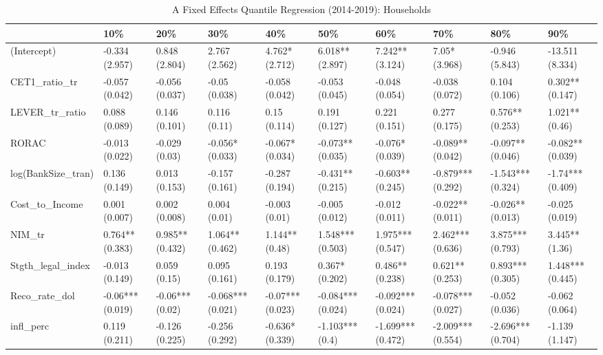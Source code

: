 \begin{table}[ht]
\centering
\caption{A Fixed Effects Quantile Regression (2014-2019): Households} 
\begingroup\small
\begin{tabular}{llllllllll}
  \toprule
 & 10\% & 20\% & 30\% & 40\% & 50\% & 60\% & 70\% & 80\% & 90\% \\ 
  \midrule
(Intercept) & -0.334 (2.957) & 0.848 (2.804) & 2.767 (2.562) & 4.762* (2.712) & 6.018** (2.897) & 7.242** (3.124) & 7.05* (3.968) & -0.946 (5.843) & -13.511 (8.334) \\ 
  CET1\_ratio\_tr & -0.057 (0.042) & -0.056 (0.037) & -0.05 (0.038) & -0.058 (0.042) & -0.053 (0.045) & -0.048 (0.054) & -0.038 (0.072) & 0.104 (0.106) & 0.302** (0.147) \\ 
  LEVER\_tr\_ratio & 0.088 (0.089) & 0.146 (0.101) & 0.116 (0.11) & 0.15 (0.114) & 0.191 (0.127) & 0.221 (0.151) & 0.277 (0.175) & 0.576** (0.253) & 1.021** (0.46) \\ 
  RORAC & -0.013 (0.022) & -0.029 (0.03) & -0.056* (0.033) & -0.067* (0.034) & -0.073** (0.035) & -0.076* (0.039) & -0.089** (0.042) & -0.097** (0.046) & -0.082** (0.039) \\ 
  log(BankSize\_tran) & 0.136 (0.149) & 0.013 (0.153) & -0.157 (0.161) & -0.287 (0.194) & -0.431** (0.215) & -0.603** (0.245) & -0.879*** (0.292) & -1.543*** (0.324) & -1.74*** (0.409) \\ 
  Cost\_to\_Income & 0.001 (0.007) & 0.002 (0.008) & 0.004 (0.01) & -0.003 (0.01) & -0.005 (0.012) & -0.012 (0.011) & -0.022** (0.011) & -0.026** (0.013) & -0.025 (0.019) \\ 
  NIM\_tr & 0.764** (0.383) & 0.985** (0.432) & 1.064** (0.462) & 1.144** (0.48) & 1.548*** (0.503) & 1.975*** (0.547) & 2.462*** (0.636) & 3.875*** (0.793) & 3.445** (1.36) \\ 
  Stgth\_legal\_index & -0.013 (0.149) & 0.059 (0.15) & 0.095 (0.161) & 0.193 (0.179) & 0.367* (0.202) & 0.486** (0.238) & 0.621** (0.253) & 0.893*** (0.305) & 1.448*** (0.445) \\ 
  Reco\_rate\_dol & -0.06*** (0.019) & -0.06*** (0.02) & -0.068*** (0.021) & -0.07*** (0.023) & -0.084*** (0.024) & -0.092*** (0.024) & -0.078*** (0.027) & -0.052 (0.036) & -0.062 (0.064) \\ 
  infl\_perc & 0.119 (0.211) & -0.126 (0.225) & -0.256 (0.292) & -0.636* (0.339) & -1.103*** (0.4) & -1.699*** (0.472) & -2.009*** (0.554) & -2.696*** (0.704) & -1.139 (1.147) \\ 

\end{tabular}
\end{table}
